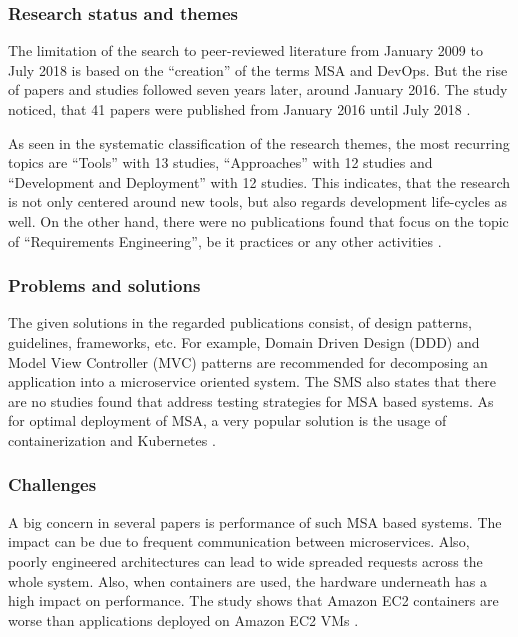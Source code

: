 \subsubsection{Research status and themes}

The limitation of the search to peer-reviewed literature from January 2009 to
July 2018 is based on the ``creation'' of the terms MSA and DevOps.
But the rise of papers and studies followed seven years later, around January 2016.
The study noticed, that 41 papers were published from January 2016 until July 2018
\cite{waseem:SMSMSADevOps}.

As seen in the systematic classification of the research themes, the most recurring
topics are ``Tools'' with 13 studies, ``Approaches'' with 12 studies and
``Development and Deployment'' with 12 studies. This indicates, that the research
is not only centered around new tools, but also regards development life-cycles
as well. On the other hand, there were no publications found that focus on
the topic of ``Requirements Engineering'', be it practices or any other
activities \cite{waseem:SMSMSADevOps}.

\subsubsection{Problems and solutions}

The given solutions in the regarded publications consist, of
design patterns, guidelines, frameworks, etc. For example,
Domain Driven Design (DDD) and Model View Controller (MVC) patterns
are recommended for decomposing an application into a microservice oriented
system. The SMS also states that there are no studies found that
address testing strategies for MSA based systems. As for optimal deployment
of MSA, a very popular solution is the usage of containerization and Kubernetes
\cite{waseem:SMSMSADevOps}.

\subsubsection{Challenges}

A big concern in several papers is performance of such MSA based systems.
The impact can be due to frequent communication between microservices.
Also, poorly engineered architectures can lead to wide spreaded requests
across the whole system. Also, when containers are used, the hardware underneath
has a high impact on performance. The study shows that Amazon EC2 containers are
worse than applications deployed on Amazon EC2 VMs \cite{waseem:SMSMSADevOps}.

